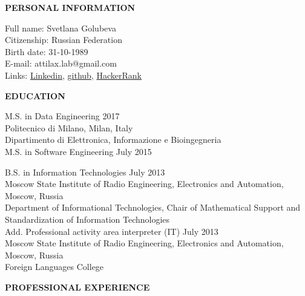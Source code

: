 \documentclass[a4paper,12pt,fullpage]{article}
\begin{document}
\begin{center}
	\textbf{PERSONAL INFORMATION\\}
\end{center}

Full name: \hfill Svetlana Golubeva\\
Citizenship: \hfill Russian Federation\\
Birth date: \hfill 31-10-1989\\
E-mail: \hfill attilax.lab@gmail.com \\
Links: \hfill  \href{}{Linkedin}, \href{https://github.com/attillax}{github}, 
\href{https://www.hackerrank.com/attillax}{HackerRank}\\

\begin{center}
	\textbf{EDUCATION}
\end{center}	

M.S. in Data Engineering \hfill 2017\\
Politecnico di Milano, Milan, Italy\\
Dipartimento di Elettronica, Informazione e Bioingegneria\\

M.S. in Software Engineering \hfill July 2015

B.S. in Information Technologies \hfill July 2013\\
Moscow State Institute of Radio Engineering, Electronics and Automation, Moscow, Russia\\
Department of Informational Technologies, Chair of Mathematical Support and Standardization of Information Technologies\\

Add. Professional activity area interpreter (IT) \hfill July 2013\\
Moscow State Institute of Radio Engineering, Electronics and Automation, Moscow, Russia\\
Foreign Languages College\\

\begin{center}
	\textbf{PROFESSIONAL EXPERIENCE}
\end{center}	
\end{document}
